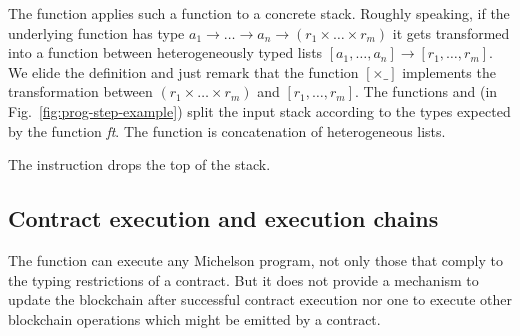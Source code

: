 The function  applies such a function to a concrete
stack. Roughly speaking, if the underlying function has type $a_1 \to \dots \to a_n \to
(r_1 \times \dots \times r_m)$ it gets transformed into a function
between heterogeneously typed lists
$[a_1, \dots, a_n] \to [r_1, \dots, r_m]$. We elide the definition and
just remark that the function $[{\times}\_]$ implements the
transformation between $(r_1 \times \dots \times r_m)$ and $[r_1,
\dots, r_m]$. The functions  and  (in Fig.~\ref{fig:prog-step-example}) split the
input stack according to the types expected by the function \textit{ft}. The
function  is concatenation of heterogeneous lists.

The  instruction drops the top of the stack.



\subsection{Contract execution and execution chains}\label{sec:contract-execution}

The  function can execute any Michelson program, not only those that comply
to the typing restrictions of a contract.
But it does not provide a mechanism to update the blockchain after successful contract execution
nor one to execute other blockchain operations which might be emitted by a contract.

\begin{comment}
When a contract execution terminates, the final stack interpretation will contain a pair
of a list of blockchain operations to be emitted by the contract as well as the updated
storage value of the contract.
Also contract execution is triggered by transfering some amount of Tezos tokens to it,
so it's balance and storage has to be updated and the emitted operations
must be staged for execution.
\end{comment}


